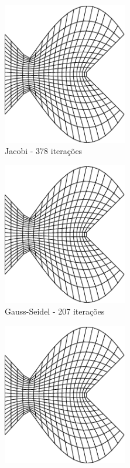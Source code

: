 \documentclass{article}
\begin{document}
		\begin{figure}
		\centering
			\begin{subfigure}[b]{0.45\textwidth}
				\centering
				\includegraphics[width=0.6\textwidth]{figures/fish-jacobi.eps}
				\caption{Jacobi - 378 iterações}
			\end{subfigure}
			\begin{subfigure}[b]{0.45\textwidth}
				\centering
				\includegraphics[width=0.6\textwidth]{figures/fish-gauss.eps}
				\caption{Gauss-Seidel - 207 iterações}
			\end{subfigure}
			\begin{subfigure}[b]{0.45\textwidth}
				\centering
				\includegraphics[width=0.6\textwidth]{figures/fish-sor.eps}

\end{subfigure}
\end{figure}
\end{document}
